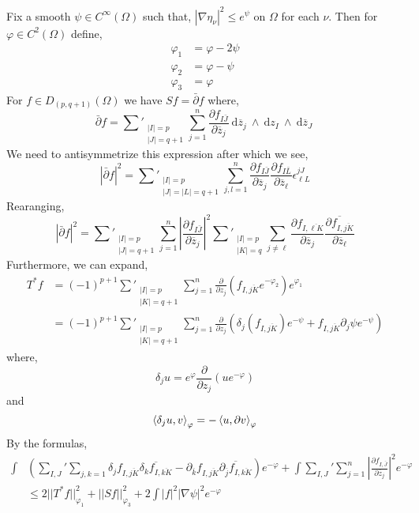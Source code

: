 \documentclass[12pt]{extarticle}
\renewcommand{\d}[1]{\: \mathrm{d}#1 \:}
\newcommand{\pderiv}[2]{\frac{\partial{#1}}{\partial{#2}}}
\theoremstyle{definition}
\begin{document}
Fix a smooth $\psi \in C^\infty(\Omega)$ such that,
$| \nabla \eta_\nu |^2 \le e^\psi$ on $\Omega$ for each $\nu$. Then for $\varphi \in C^2(\Omega)$ define,
\begin{align*}
\varphi_1 & = \varphi - 2 \psi
\\
\varphi_2 & = \varphi - \psi
\\
\varphi_3 & = \varphi
\end{align*}
For $f \in D_{(p, q+1)}(\Omega)$ we have $Sf = \bar{\partial} f$ where,
\[ \bar{\partial} f = \sum'_{\substack{|I| = p \\ |J| = q+1}} \sum_{j = 1}^n \pderiv{f_{I \bar{J}}}{\overline{z}_j} \d{\overline{z}_j} \wedge \d{z_I} \wedge \d{\overline{z}_J} \]
We need to antisymmetrize this expression after which we see,
\[ | \bar{\partial} f |^2 = \sum'_{\substack{|I| = p \\ |J| = |L| = q+1}} \sum_{j,l = 1}^n \pderiv{f_{I \bar{J}}}{\overline{z}_j} \pderiv{f_{I\bar{L}}}{\overline{z}_\ell} \epsilon^{j J}_{\ell L} \]
Rearanging,
\[ | \bar{\partial} f |^2 = \sum'_{\substack{|I| = p \\ |J| = q + 1}} \sum_{j = 1}^n \left| \pderiv{f_{I \bar{J}}}{\overline{z}_j} \right|^2  \sum'_{\substack{|I| = p \\ |K| = q}} \sum_{j \neq \ell} \pderiv{f_{I, \overline{\ell K}}}{\overline{z}_j} \overline{\pderiv{f_{I, \overline{jK}}}{\overline{z}_{\ell}}} \]
Furthermore, we can expand,
\begin{align*}
T^* f & = (-1)^{p+1} \sum'_{\substack{|I| = p \\ |K| = q+1}} \sum_{j = 1}^n \pderiv{}{z_j} \left( f_{I, \overline{jK}}  e^{-\varphi_2} \right) e^{\varphi_1} 
\\
& = (-1)^{p+1} \sum'_{\substack{|I| = p \\ |K| = q+1}} \sum_{j = 1}^n \pderiv{}{z_j} \left( \delta_j(f_{I, \overline{jK}})  e^{-\psi} + f_{I, \overline{jK}} \partial_j \psi e^{- \psi} \right) 
\end{align*}
where,
\[ \delta_j u = e^\varphi \pderiv{}{z_j} (u e^{-\varphi})  \]
and
\[ 
\left< \delta_j u, v \right>_{\varphi} = - \left< u, \partial v \right>_\varphi \]
By the formulas,
\begin{align*}
\int & \left( \sum_{I,J}' \sum_{j,k = 1} \delta_j f_{I, \overline{jK}} \overline{\delta_k f_{I, \overline{kK}}} - \partial_{\bar{k}} f_{I, \overline{jK}} \overline{\partial_{\bar{j}} f_{I, \overline{kK}}} \right) e^{-\varphi} 
+ \int \sum_{I,J}' \sum^n_{j = 1} \left| \pderiv{f_{I,\bar{J}}}{\overline{z}_j} \right|^2 e^{-\varphi} 
\\
& \le 2 || T^* f||^2_{\varphi_1} + || S f ||^2_{\varphi_3} + 2 \int |f|^2 |\nabla \psi|^2 e^{-\varphi} 
\end{align*}
\end{document}
